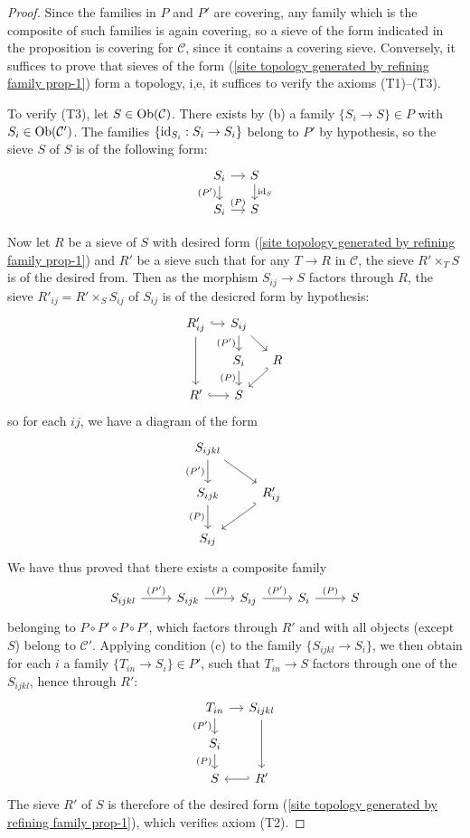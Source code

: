 \begin{proof}
Since the families in $P$ and $P'$ are covering, any family which is the composite of such families is again covering, so a sieve of the form indicated in the proposition is covering for $\mathcal{C}$, since it contains a covering sieve. Conversely, it suffices to prove that sieves of the form (\ref{site topology generated by refining family prop-1}) form a topology, i,e, it suffices to verify the axioms (T1)--(T3).\par
To verify (T3), let $S\in\mathrm{Ob}(\mathcal{C})$. There exists by (b) a family $\{S_i\to S\}\in P$ with $S_i\in\mathrm{Ob}(\mathcal{C}')$. The families $\{\operatorname{id}_{S_i}:S_i\to S_i\}$ belong to $P'$ by hypothesis, so the sieve $S$ of $S$ is of the following form:
\[\begin{tikzcd}[row sep=4mm, column sep=4mm]
S_i\ar[r]\ar[d,swap,"(P')"]&S\ar[d,"\id_S"]\\
S_i\ar[r,"(P)"]&S
\end{tikzcd}\]

Now let $R$ be a sieve of $S$ with desired form (\ref{site topology generated by refining family prop-1}) and $R'$ be a sieve such that for any $T\to R$ in $\mathcal{C}$, the sieve $R'\times_TS$ is of the desired from. Then as the morphism $S_{ij}\to S$ factors through $R$, the sieve $R'_{ij}=R'\times_SS_{ij}$ of $S_{ij}$ is of the desicred form by hypothesis:
\[\begin{tikzcd}[row sep=4mm, column sep=4mm]
R'_{ij}\ar[dd]\ar[r,hook]&S_{ij}\ar[d,swap,"(P')"]\ar[rd]&\\
&S_i\ar[d,swap,"(P)"]&R\ar[ld,hook']\\
R'\ar[r,hook]&S&
\end{tikzcd}\]
so for each $ij$, we have a diagram of the form
\[\begin{tikzcd}
S_{ijkl}\ar[rd]\ar[d,swap,"(P')"]&\\
S_{ijk}\ar[d,swap,"(P)"]&R'_{ij}\ar[ld,hook']\\
S_{ij}
\end{tikzcd}\]
We have thus proved that there exists a composite family
\[\begin{tikzcd}
S_{ijkl}\ar[r,"(P')"]&S_{ijk}\ar[r,"(P)"]&S_{ij}\ar[r,"(P')"]&S_i\ar[r,"(P)"]&S
\end{tikzcd}\]
belonging to $P\circ P'\circ P\circ P'$, which factors through $R'$ and with all objects (except $S$) belong to $\mathcal{C}'$. Applying condition (c) to the family $\{S_{ijkl}\to S_i\}$, we then obtain for each $i$ a family $\{T_{in}\to S_i\}\in P'$, such that $T_{in}\to S$ factors through one of the $S_{ijkl}$, hence through $R'$:
\[\begin{tikzcd}[row sep=4mm, column sep=4mm]
T_{in}\ar[r]\ar[d,swap,"(P')"]&S_{ijkl}\ar[dd]\\
S_i\ar[d,swap,"(P)"]&\\
S&R'\ar[l,hook']
\end{tikzcd}\]
The sieve $R'$ of $S$ is therefore of the desired form (\ref{site topology generated by refining family prop-1}), which verifies axiom (T2).\par


\end{proof}
